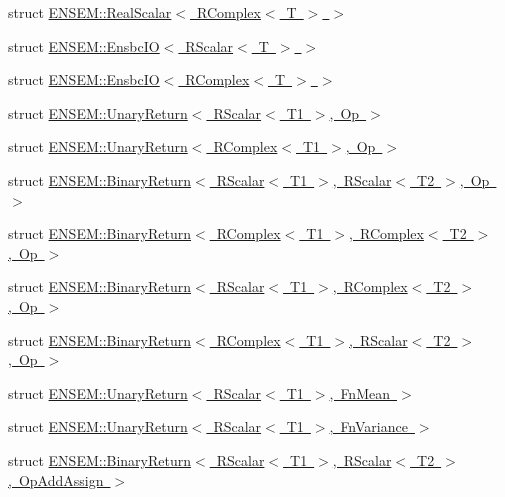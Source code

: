 \begin{DoxyCompactItemize}
\item 
struct \mbox{\hyperlink{structENSEM_1_1RealScalar_3_01RComplex_3_01T_01_4_01_4}{E\+N\+S\+E\+M\+::\+Real\+Scalar$<$ R\+Complex$<$ T $>$ $>$}}
\item 
struct \mbox{\hyperlink{structENSEM_1_1EnsbcIO_3_01RScalar_3_01T_01_4_01_4}{E\+N\+S\+E\+M\+::\+Ensbc\+I\+O$<$ R\+Scalar$<$ T $>$ $>$}}
\item 
struct \mbox{\hyperlink{structENSEM_1_1EnsbcIO_3_01RComplex_3_01T_01_4_01_4}{E\+N\+S\+E\+M\+::\+Ensbc\+I\+O$<$ R\+Complex$<$ T $>$ $>$}}
\item 
struct \mbox{\hyperlink{structENSEM_1_1UnaryReturn_3_01RScalar_3_01T1_01_4_00_01Op_01_4}{E\+N\+S\+E\+M\+::\+Unary\+Return$<$ R\+Scalar$<$ T1 $>$, Op $>$}}
\item 
struct \mbox{\hyperlink{structENSEM_1_1UnaryReturn_3_01RComplex_3_01T1_01_4_00_01Op_01_4}{E\+N\+S\+E\+M\+::\+Unary\+Return$<$ R\+Complex$<$ T1 $>$, Op $>$}}
\item 
struct \mbox{\hyperlink{structENSEM_1_1BinaryReturn_3_01RScalar_3_01T1_01_4_00_01RScalar_3_01T2_01_4_00_01Op_01_4}{E\+N\+S\+E\+M\+::\+Binary\+Return$<$ R\+Scalar$<$ T1 $>$, R\+Scalar$<$ T2 $>$, Op $>$}}
\item 
struct \mbox{\hyperlink{structENSEM_1_1BinaryReturn_3_01RComplex_3_01T1_01_4_00_01RComplex_3_01T2_01_4_00_01Op_01_4}{E\+N\+S\+E\+M\+::\+Binary\+Return$<$ R\+Complex$<$ T1 $>$, R\+Complex$<$ T2 $>$, Op $>$}}
\item 
struct \mbox{\hyperlink{structENSEM_1_1BinaryReturn_3_01RScalar_3_01T1_01_4_00_01RComplex_3_01T2_01_4_00_01Op_01_4}{E\+N\+S\+E\+M\+::\+Binary\+Return$<$ R\+Scalar$<$ T1 $>$, R\+Complex$<$ T2 $>$, Op $>$}}
\item 
struct \mbox{\hyperlink{structENSEM_1_1BinaryReturn_3_01RComplex_3_01T1_01_4_00_01RScalar_3_01T2_01_4_00_01Op_01_4}{E\+N\+S\+E\+M\+::\+Binary\+Return$<$ R\+Complex$<$ T1 $>$, R\+Scalar$<$ T2 $>$, Op $>$}}
\item 
struct \mbox{\hyperlink{structENSEM_1_1UnaryReturn_3_01RScalar_3_01T1_01_4_00_01FnMean_01_4}{E\+N\+S\+E\+M\+::\+Unary\+Return$<$ R\+Scalar$<$ T1 $>$, Fn\+Mean $>$}}
\item 
struct \mbox{\hyperlink{structENSEM_1_1UnaryReturn_3_01RScalar_3_01T1_01_4_00_01FnVariance_01_4}{E\+N\+S\+E\+M\+::\+Unary\+Return$<$ R\+Scalar$<$ T1 $>$, Fn\+Variance $>$}}
\item 
struct \mbox{\hyperlink{structENSEM_1_1BinaryReturn_3_01RScalar_3_01T1_01_4_00_01RScalar_3_01T2_01_4_00_01OpAddAssign_01_4}{E\+N\+S\+E\+M\+::\+Binary\+Return$<$ R\+Scalar$<$ T1 $>$, R\+Scalar$<$ T2 $>$, Op\+Add\+Assign $>$}}

\end{DoxyCompactItemize}
